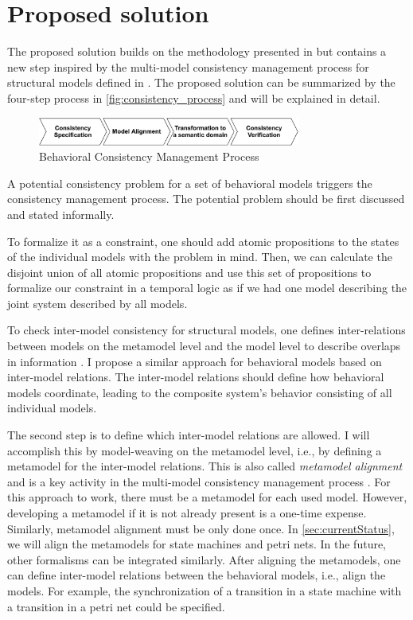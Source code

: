 \documentclass[conference]{IEEEtran}
\begin{document}
\section{Proposed solution}
The proposed solution builds on the methodology presented in \cite{engelsMethodologySpecifyingAnalyzing2001} but contains a new step inspired by the multi-model consistency management process for structural models defined in \cite{stunkelMultipleModelSynchronization2020}.
The proposed solution can be summarized by the four-step process in \autoref{fig:consistency_process} and will be explained in detail.

\begin{figure}[h]
    \centering
    \includegraphics[width=3.4in]{methodology}
    \caption{Behavioral Consistency Management Process}
    \label{fig:consistency_process}
\end{figure}
A potential consistency problem for a set of behavioral models triggers the consistency management process.
The potential problem should be first discussed and stated informally.

To formalize it as a constraint, one should add atomic propositions to the states of the individual models with the problem in mind.
Then, we can calculate the disjoint union of all atomic propositions and use this set of propositions to formalize our constraint in a temporal logic as if we had one model describing the joint system described by all models.

To check inter-model consistency for structural models, one defines inter-relations between models on the metamodel level and the model level to describe overlaps in information \cite{stunkelMultipleModelSynchronization2020}.
I propose a similar approach for behavioral models based on inter-model relations.
The inter-model relations should define how behavioral models coordinate, leading to the composite system's behavior consisting of all individual models.

The second step is to define which inter-model relations are allowed.
I will accomplish this by model-weaving on the metamodel level, i.e., by defining a metamodel for the inter-model relations.
This is also called \textit{metamodel alignment} and is a key activity in the multi-model consistency management process \cite{stunkelMultipleModelSynchronization2020}.
For this approach to work, there must be a metamodel for each used model.
However, developing a metamodel if it is not already present is a one-time expense.
Similarly, metamodel alignment must be only done once.
In \autoref{sec:currentStatus}, we will align the metamodels for state machines and petri nets.
In the future, other formalisms can be integrated similarly.
After aligning the metamodels, one can define inter-model relations between the behavioral models, i.e., align the models.
For example, the synchronization of a transition in a state machine with a transition in a petri net could be specified.
\end{document}
